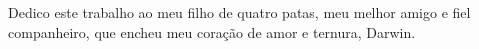 \documentclass[12pt,openright,twoside,a4paper,sumario=tradicional,english,brazil]{abntex2}
\begin{document}
 

\imprimircapa
\imprimirfolhaderosto*




\begin{dedicatoria}
\vspace*{\fill}
\begin{flushright}
Dedico este trabalho ao meu filho de quatro patas, meu melhor amigo e fiel companheiro, que encheu meu coração de amor e ternura, Darwin.
\vspace{2cm}
\end{flushright}
\end{dedicatoria}

\end{document}
